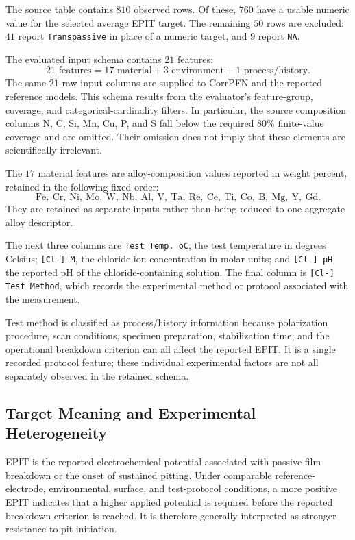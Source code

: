 \documentclass{article}
\begin{document}
The source table contains \(810\) observed rows. Of these, \(760\) have a
usable numeric value for the selected average EPIT target. The remaining
\(50\) rows are excluded: \(41\) report \texttt{Transpassive} in place of a
numeric target, and \(9\) report \texttt{NA}.

The evaluated input schema contains \(21\) features:
\begin{equation}
21\text{ features}
=17\text{ material}+3\text{ environment}+1\text{ process/history}.
\label{eq:epit-schema}
\end{equation}
The same \(21\) raw input columns are supplied to CorrPFN and the reported
reference models. This schema results from the evaluator's feature-group,
coverage, and categorical-cardinality filters. In particular, the source
composition columns N, C, Si, Mn, Cu, P, and S fall below the required
\(80\%\) finite-value coverage and are omitted. Their omission does not imply
that these elements are scientifically irrelevant.

The \(17\) material features are alloy-composition values reported in weight
percent, retained in the following fixed order:
\[
\mathrm{Fe,\ Cr,\ Ni,\ Mo,\ W,\ Nb,\ Al,\ V,\ Ta,\ Re,\ Ce,\ Ti,\ Co,\ B,\ Mg,\ Y,\ Gd}.
\]
They are retained as separate inputs rather than being reduced to one
aggregate alloy descriptor.

The next three columns are \texttt{Test Temp. oC}, the test temperature in
degrees Celsius; \texttt{[Cl-] M}, the chloride-ion concentration in molar
units; and \texttt{[Cl-] pH}, the reported pH of the chloride-containing
solution. The final column is \texttt{[Cl-] Test Method}, which records the
experimental method or protocol associated with the measurement.

Test method is classified as process/history information because polarization
procedure, scan conditions, specimen preparation, stabilization time, and the
operational breakdown criterion can all affect the reported EPIT. It is a
single recorded protocol feature; these individual experimental factors are
not all separately observed in the retained schema.

\subsection{Target Meaning and Experimental Heterogeneity}

EPIT is the reported electrochemical potential associated with passive-film
breakdown or the onset of sustained pitting. Under comparable
reference-electrode, environmental, surface, and test-protocol conditions, a
more positive EPIT indicates that a higher applied potential is required
before the reported breakdown criterion is reached. It is therefore generally
interpreted as stronger resistance to pit initiation.
\end{document}
